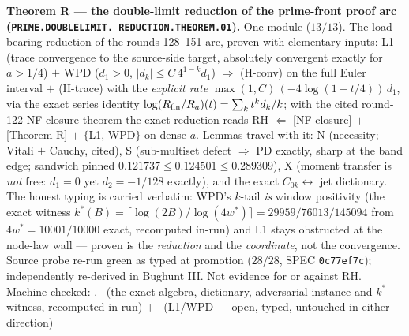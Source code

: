 \par\smallskip\noindent\textbf{Theorem R --- the double-limit
reduction of the prime-front proof arc
(\texttt{PRIME.\allowbreak DOUBLELIMIT.\allowbreak
REDUCTION.\allowbreak THEOREM.01}).}
One module ($13/13$).  The load-bearing reduction of the
rounds-128--151 arc, proven with elementary inputs: L1 (trace
convergence to the source-side target, absolutely convergent
exactly for $a > 1/4$) $+$ WPD ($d_1 > 0$,
$|d_k| \le C\,4^{1-k} d_1$) $\Rightarrow$ (H-conv) on the full
Euler interval $+$ (H-trace) with the \emph{explicit rate}
$\max(1, C)\,(-4\log(1 - t/4))\,d_1$, via the exact series
identity $\log(R_{\rm fin}/R_a)(t) = \sum_k t^k d_k/k$; with the
cited round-122 NF-closure theorem the exact reduction reads
RH $\Leftarrow$ [NF-closure] $+$ [Theorem R] $+$
$\{$L1, WPD$\}$ on dense $a$.  Lemmas travel with it: N
(necessity; Vitali $+$ Cauchy, cited), S (sub-multiset defect
$\Rightarrow$ PD exactly, sharp at the band edge; sandwich
pinned $0.121737 \le 0.124501 \le 0.289309$), X (moment transfer
is \emph{not} free: $d_1 = 0$ yet $d_2 = -1/128$ exactly), and
the exact $C_{0k} \leftrightarrow$ jet dictionary.  The honest
typing is carried verbatim: WPD's $k$-tail \emph{is} window
positivity (the exact witness $k^*(B) =
\lceil\log(2B)/\log(4w^*)\rceil = 29959/76013/145094$ from
$4w^* = 10001/10000$ exact, recomputed in-run) and L1 stays
obstructed at the node-law wall --- proven is the
\emph{reduction} and the \emph{coordinate}, not the convergence.
Source probe re-run green as typed at promotion ($28/28$,
SPEC \texttt{0c77ef7c}); independently re-derived in Bughunt III.
Not evidence for or against RH.
Machine-checked: .
\mE\ (the exact algebra, dictionary, adversarial instance and
$k^*$ witness, recomputed in-run) $+$ \mO\ (L1/WPD --- open,
typed, untouched in either direction)
\par\smallskip


